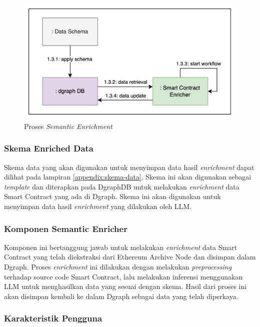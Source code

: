 \begin{figure}[ht]
	\centering
	\includegraphics[width=1\textwidth]{resources/chapter-3/proses-semantik-enrichment.png}
	\caption{Proses \textit{Semantic Enrichment}}
	\label{image:proses-enrichment}
\end{figure}

\subsubsection{Skema Enriched Data}

Skema data yang akan digunakan untuk menyimpan data hasil \textit{enrichment} dapat dilihat pada lampiran \ref{appendix:skema-data}. Skema ini akan digunakan sebagai \textit{template} dan diterapkan pada DgraphDB untuk melakukan \textit{enrichment} data Smart Contract yang ada di Dgraph. Skema ini akan digunakan untuk menyimpan data hasil \textit{enrichment} yang dilakukan oleh LLM.

\subsubsection{Komponen Semantic Enricher}

Komponen ini bertanggung jawab untuk melakukan \textit{enrichment} data Smart Contract yang telah diekstraksi dari Ethereum Archive Node dan disimpan dalam Dgraph. Proses \textit{enrichment} ini dilakukan dengan melakukan \textit{preprocessing} terhadap source code Smart Contract, lalu melakukan inferensi menggunakan LLM untuk menghasilkan data yang sesuai dengan skema. Hasil dari proses ini akan disimpan kembali ke dalam Dgraph sebagai data yang telah diperkaya.

\subsubsection{Karakteristik Pengguna}

